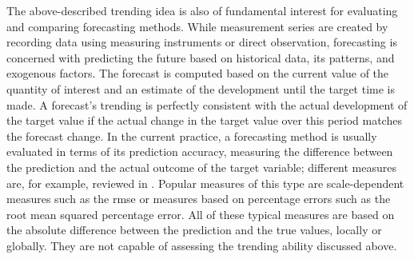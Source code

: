 The above-described trending idea is also of fundamental interest for evaluating and comparing forecasting methods. 
While measurement series are created by recording data using measuring instruments or direct observation, forecasting is concerned with predicting the future based on historical data, its patterns, and exogenous factors. 
The forecast is computed based on the current value of the quantity of interest and an estimate of the development until the target time is made.
A forecast's trending is perfectly consistent with the actual development of the target value if the actual change in the target value over this period matches the forecast change. 
In the current practice, a forecasting method is usually evaluated in terms of its prediction accuracy, measuring the difference between the prediction and the actual outcome of the target variable; different measures are, for example, reviewed in \cite{hyndman2006another}. 
Popular measures of this type are scale-dependent measures such as the \ac{rmse} or measures based on percentage errors such as the root mean squared percentage error. 
All of these typical measures are based on the absolute difference between the prediction and the true values, locally or globally. 
They are not capable of assessing the trending ability discussed above.

